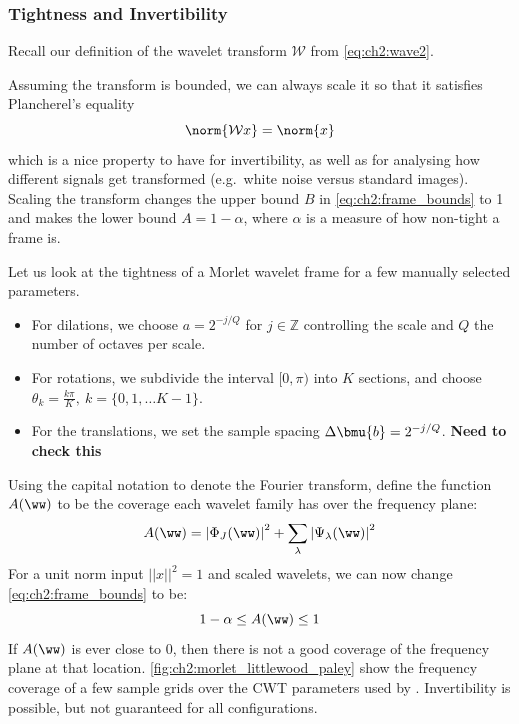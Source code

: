 \subsubsection{Tightness and Invertibility}
Recall our definition of the wavelet transform $\mathcal{W}$ from \eqref{eq:ch2:wave2}.

Assuming the transform is bounded, we can always scale it so that it satisfies
Plancherel's equality
\begin{equation}
  \norm{\mathcal{W}x} = \norm{x}
\end{equation}
which is a nice property to have for invertibility, as well as for analysing
how different signals get transformed (e.g.\ white noise versus standard
images). Scaling the transform changes the upper bound $B$ in \eqref{eq:ch2:frame_bounds} 
to 1 and makes the lower bound $A = 1-\alpha$, where $\alpha$ is a measure of how
non-tight a frame is.
  
Let us look at the tightness of a Morlet wavelet frame for a few manually selected parameters. 
\begin{itemize}
  \item For dilations, we choose $a = 2^{-j/Q}$ for $j\in \mathbb{Z}$
    controlling the scale and $Q$ the number of octaves per scale.
  \item For rotations, we subdivide the interval $[0, \pi)$ into $K$ sections,
    and choose $\theta_k = \frac{k\pi}{K},\ k = \{0, 1, \ldots K-1\}$.
  \item For the translations, we set the sample spacing $\Delta \bmu{b} =
    2^{-j/Q}$. \textbf{Need to check this} 
\end{itemize}
  
Using the capital notation to denote the Fourier transform, define the function
$A(\ww)$ to be the coverage each wavelet family has over the frequency plane: 
\begin{equation}
  A(\ww) = {|\Phi_J(\ww)|}^2 + \sum_{\lambda} {|\Psi_{\lambda}(\ww)|}^2
  \label{eq:ch2:lwood_paley}
\end{equation}
For a unit norm input $||x||^2 = 1$ and scaled wavelets, we can now change
\eqref{eq:ch2:frame_bounds} to be:
\begin{equation}
  1-\alpha \leq A(\ww) \leq 1
\end{equation}
  If $A(\ww)$ is ever close to 0, then there is not a good coverage of the frequency plane
  at that location. 
  \autoref{fig:ch2:morlet_littlewood_paley} show the frequency coverage of a few
  sample grids over the CWT parameters used by \Mallat. Invertibility is possible, but not
  guaranteed for all configurations. 
  

